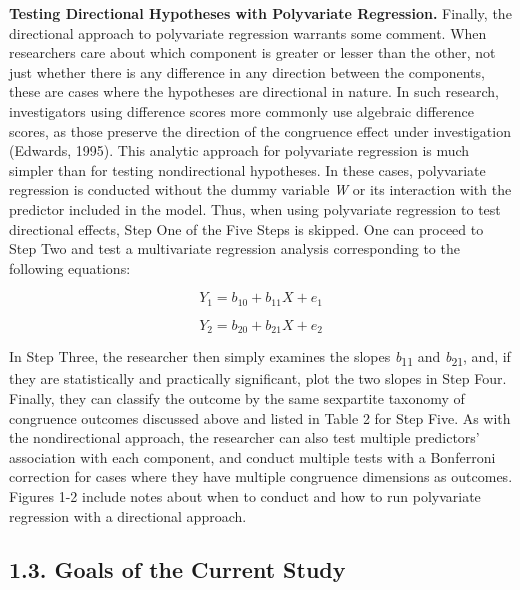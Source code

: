 \documentclass[authordate, meta]{jote-new-article}
\begin{document}
	\textbf{Testing Directional Hypotheses with Polyvariate Regression. }Finally, the directional approach to polyvariate regression warrants some comment. When researchers care about which component is greater or lesser than the other, not just whether there is any difference in any direction between the components, these are cases where the hypotheses are directional in nature. In such research, investigators using difference scores more commonly use algebraic difference scores, as those preserve the direction of the congruence effect under investigation (Edwards, 1995). This analytic approach for polyvariate regression is much simpler than for testing nondirectional hypotheses. In these cases, polyvariate regression is conducted without the dummy variable \emph{W} or its interaction with the predictor included in the model. Thus, when using polyvariate regression to test directional effects, Step One of the Five Steps is skipped. One can proceed to Step Two and test a multivariate regression analysis corresponding to the following equations:



	\begin{equation}
		Y_1= b_{10}+b_{11}X+e_1
	\end{equation}



	\begin{equation}
		Y_2= b_{20}+b_{21}X+e_2
	\end{equation}



	In Step Three, the researcher then simply examines the slopes \emph{b}\textsubscript{11 }and \emph{b}\textsubscript{21}, and, if they are statistically and practically significant, plot the two slopes in Step Four. Finally, they can classify the outcome by the same sexpartite taxonomy of congruence outcomes discussed above and listed in Table 2 for Step Five. As with the nondirectional approach, the researcher can also test multiple predictors' association with each component, and conduct multiple tests with a Bonferroni correction for cases where they have multiple congruence dimensions as outcomes. Figures 1-2 include notes about when to conduct and how to run polyvariate regression with a directional approach.



	\subsection{1.3. Goals of the Current Study}
\end{document}
